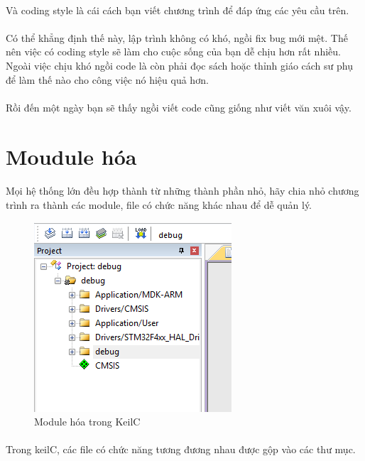 \documentclass[12pt,a5paper]{book}
\begin{document}
\paragraph{}
Và coding style là cái cách bạn viết chương trình để đáp ứng các yêu cầu trên.
\paragraph{}
Có thể khẳng định thế này, lập trình không có khó, ngồi fix bug mới mệt. Thế nên việc có coding style sẽ làm cho cuộc sống của bạn dễ chịu hơn rất nhiều. Ngoài việc chịu khó ngồi code là còn phải đọc sách hoặc thỉnh giáo cách sư phụ để làm thế nào cho công việc nó hiệu quả hơn.
\paragraph{}
Rồi đến một ngày bạn sẽ thấy ngồi viết code cũng giống như viết văn xuôi vậy.
\newpage
\section{Moudule hóa}
\paragraph{}
Mọi hệ thống lớn đều hợp thành từ những thành phần nhỏ, hãy chia nhỏ chương trình ra thành các module, file có chức năng khác nhau để dễ quản lý.
\begin{figure}[h!]
\centering
 \includegraphics[width=0.6\linewidth]{module.png}
 \caption{Module hóa trong KeilC}
\end{figure}
\paragraph{}
Trong keilC, các file có chức năng tương đương nhau được gộp vào các thư mục.
\end{document}
